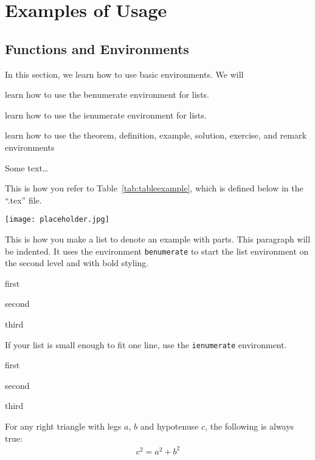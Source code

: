 \documentclass[10pt,oneside]{book}
\begin{document}
\chapter{Examples of Usage}


\section{Functions and Environments}


\begin{objectives}{In this section, we learn how to use basic environments. We will}
  \item
    learn how to use the benumerate environment for lists.
  \item
    learn how to use the ienumerate environment for lists.
  \item
    learn how to use the theorem, definition, example, solution, exercise, and remark environments
\end{objectives}


\noindent
Some text\ldots


This is how you refer to Table~\ref{tab:tableexample}, which is defined below in
the ``.tex'' file.


\begin{marginfigure}
    \texttt{[image: placeholder.jpg]}
    \caption{This is a how you put a figure in the margin.}
    \label{fig:marginfig2}
\end{marginfigure}


This is how you make a list to denote an example with parts. This paragraph will
be indented.  It uses the environment \texttt{benumerate} to start the list
environment on the second level and with bold styling. 
\begin{benumerate}
  \item first
  \item second
  \item third
\end{benumerate}


If your list is small enough to fit one line, use the \texttt{ienumerate}
environment.
\begin{ienumerate}
  \item first
  \item second
  \item third
\end{ienumerate}


\begin{theorem}
  For any right triangle with legs $a$, $b$  and hypotenuse $c$, the following
  is always true:
  \begin{align*}
    c^2 = a^2 + b^2
  \end{align*}
\end{theorem}
\end{document}
